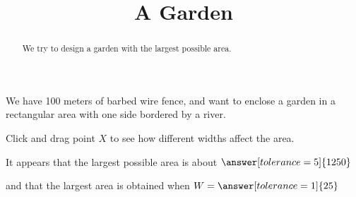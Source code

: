 \documentclass{ximera}
\title{A Garden}
\begin{document}
\begin{abstract}
We try to design a garden with the largest possible area.
\end{abstract}

We have 100 meters of barbed wire fence, and want to enclose a garden in a rectangular area with one side bordered by a river.

Click and drag point $X$ to see how different widths affect the area.


\begin{question}
It appears that the largest possible area is about $\answer[tolerance=5]{1250}$

and that the largest area is obtained when $W = \answer[tolerance=1]{25}$
\end{question}
\end{document}
